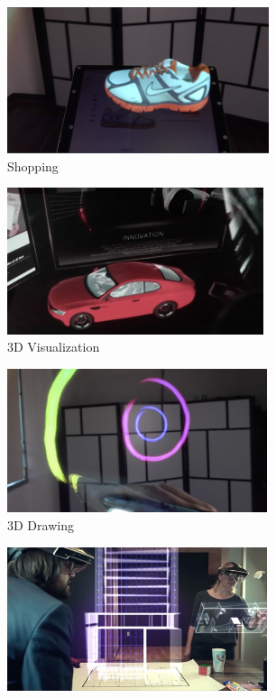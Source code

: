 \begin{figure}
\center
\begin{subfigure}[b]{3.0in}
\centering
  \includegraphics[height=1.69in]{ch7/figures/future/shopping.png} 
  \caption{Shopping}
  \label{fig:shopping}
\end{subfigure}
\begin{subfigure}[b]{3.0in}
\centering
  \includegraphics[height=1.69in]{ch7/figures/future/3d_visualization.png} 
  \caption{3D Visualization}
  \label{fig:3dvisual}
\end{subfigure}
\begin{subfigure}[b]{3.0in}
\centering
  \includegraphics[width=3.0in]{ch7/figures/future/drawing.png} 
  \caption{3D Drawing}
  \label{fig:3Ddrawing}
\end{subfigure}
\begin{subfigure}[b]{3.0in}
\centering
  \includegraphics[width=3.0in]{ch7/figures/future/architect.png} 

\end{subfigure}
\end{figure}
